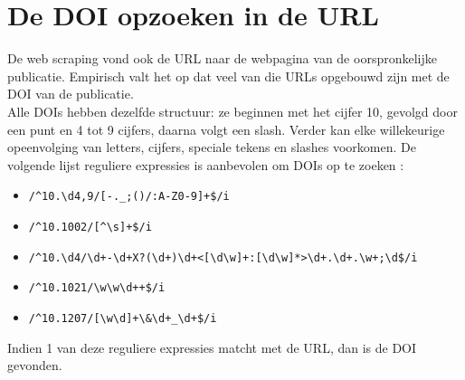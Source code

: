 \section{De DOI opzoeken in de URL}
De web scraping vond ook de URL naar de webpagina van de oorspronkelijke publicatie. Empirisch valt het op dat veel van die URLs opgebouwd zijn met de DOI van de publicatie.\\
Alle DOIs hebben dezelfde structuur: ze beginnen met het cijfer 10, gevolgd door een punt en 4 tot 9 cijfers, daarna volgt een slash. Verder kan elke willekeurige opeenvolging van letters, cijfers, speciale tekens en slashes voorkomen.
De volgende lijst reguliere expressies is aanbevolen om DOIs op te zoeken \textcite{CrossrefRegex2025}:
\begin{itemize}
    \item \texttt{/\textasciicircum10.\textbackslash d{4,9}/[-.\_;()/:A-Z0-9]+\$/i}
    \item \texttt{/\textasciicircum10.1002/[\textasciicircum\textbackslash s]+\$/i}
    \item \texttt{/\textasciicircum10.\textbackslash d{4}/\textbackslash d+-\textbackslash d+X?(\textbackslash d+)\textbackslash d+<[\textbackslash d\textbackslash w]+:[\textbackslash d\textbackslash w]*>\textbackslash d+.\textbackslash d+.\textbackslash w+;\textbackslash d\$/i}
    \item \texttt{/\textasciicircum10.1021/\textbackslash w\textbackslash w\textbackslash d++\$/i}
    \item \texttt{/\textasciicircum10.1207/[\textbackslash w\textbackslash d]+\textbackslash \&\textbackslash d+\_\textbackslash d+\$/i}
\end{itemize}
Indien 1 van deze reguliere expressies matcht met de URL, dan is de DOI gevonden.

